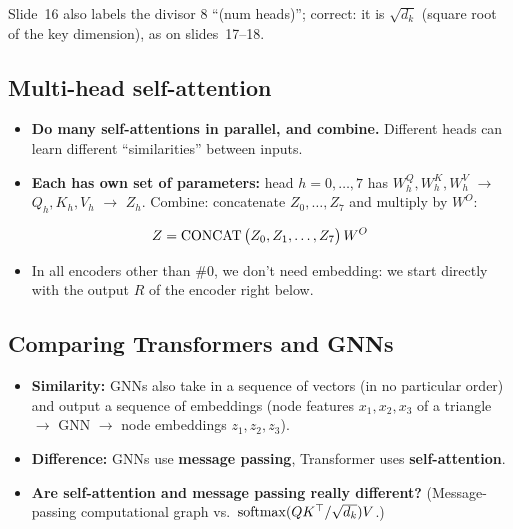 \begin{caution}
  Slide~16 also labels the divisor 8 ``(num heads)''; correct: it is
  $\sqrt{d_k}$ (square root of the key dimension), as on slides~17--18.
\end{caution}

\subsection{Multi-head self-attention}\label{sec:lec08-multihead}

\begin{itemize}
  \item \textbf{Do many self-attentions in parallel, and combine.} Different
    heads can learn different ``similarities'' between inputs.
  \item \textbf{Each has own set of parameters:} head $h=0,\dots,7$ has
    $W_h^Q,W_h^K,W_h^V$ $\to$ $Q_h,K_h,V_h$ $\to$ $Z_h$. Combine: concatenate
    $Z_0,\dots,Z_7$ and multiply by $W^O$:
\end{itemize}
\begin{equation}\label{eq:lec08-multihead}
  Z = \operatorname{CONCAT}\big(Z_0, Z_1,\dots,Z_7\big)\,W^O
\end{equation}
\begin{itemize}
  \item In all encoders other than \#0, we don't need embedding: we start
    directly with the output $R$ of the encoder right below.
\end{itemize}

\subsection{Comparing Transformers and GNNs}\label{sec:lec08-compare}

\begin{itemize}
  \item \textbf{Similarity:} GNNs also take in a sequence of vectors (in no
    particular order) and output a sequence of embeddings (node features
    $x_1,x_2,x_3$ of a triangle $\to$ GNN $\to$ node embeddings $z_1,z_2,z_3$).
  \item \textbf{Difference:} GNNs use \textbf{message passing}, Transformer uses
    \textbf{self-attention}.
  \item \textbf{Are self-attention and message passing really different?}
    (Message-passing computational graph vs.\ $\operatorname{softmax}(QK^{\top}/\sqrt{d_k})V$.)
\end{itemize}


